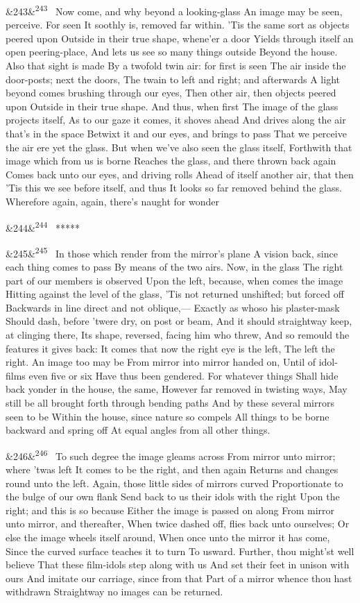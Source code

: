\documentclass[12pt]{article}
\newcommand{\para}[1][]{\par\noindent\ifx&#1&\else\textsuperscript{\footnotesize #1}~\fi}
\begin{document}
\para[243] Now come, and why beyond a looking-glass An image may be seen, perceive. For seen It soothly is, removed far within. 'Tis the same sort as objects peered upon Outside in their true shape, whene'er a door Yields through itself an open peering-place, And lets us see so many things outside Beyond the house. Also that sight is made By a twofold twin air: for first is seen The air inside the door-posts; next the doors, The twain to left and right; and afterwards A light beyond comes brushing through our eyes, Then other air, then objects peered upon Outside in their true shape. And thus, when first The image of the glass projects itself, As to our gaze it comes, it shoves ahead And drives along the air that's in the space Betwixt it and our eyes, and brings to pass That we perceive the air ere yet the glass. But when we've also seen the glass itself, Forthwith that image which from us is borne Reaches the glass, and there thrown back again Comes back unto our eyes, and driving rolls Ahead of itself another air, that then 'Tis this we see before itself, and thus It looks so far removed behind the glass. Wherefore again, again, there's naught for wonder

\para[244] *****

\para[245] In those which render from the mirror's plane A vision back, since each thing comes to pass By means of the two airs. Now, in the glass The right part of our members is observed Upon the left, because, when comes the image Hitting against the level of the glass, 'Tis not returned unshifted; but forced off Backwards in line direct and not oblique,--- Exactly as whoso his plaster-mask Should dash, before 'twere dry, on post or beam, And it should straightway keep, at clinging there, Its shape, reversed, facing him who threw, And so remould the features it gives back: It comes that now the right eye is the left, The left the right. An image too may be From mirror into mirror handed on, Until of idol-films even five or six Have thus been gendered. For whatever things Shall hide back yonder in the house, the same, However far removed in twisting ways, May still be all brought forth through bending paths And by these several mirrors seen to be Within the house, since nature so compels All things to be borne backward and spring off At equal angles from all other things.

\para[246] To such degree the image gleams across From mirror unto mirror; where 'twas left It comes to be the right, and then again Returns and changes round unto the left. Again, those little sides of mirrors curved Proportionate to the bulge of our own flank Send back to us their idols with the right Upon the right; and this is so because Either the image is passed on along From mirror unto mirror, and thereafter, When twice dashed off, flies back unto ourselves; Or else the image wheels itself around, When once unto the mirror it has come, Since the curved surface teaches it to turn To usward. Further, thou might'st well believe That these film-idols step along with us And set their feet in unison with ours And imitate our carriage, since from that Part of a mirror whence thou hast withdrawn Straightway no images can be returned.
\end{document}
